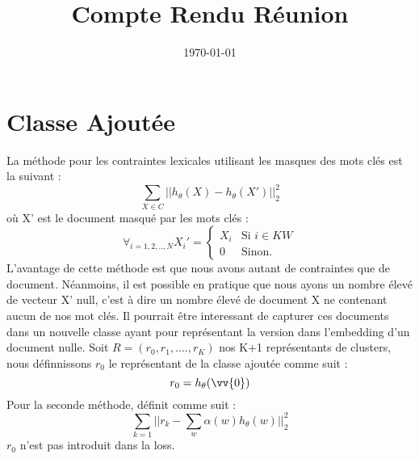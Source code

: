 \documentclass[a4paper]{article}
\title{Compte Rendu Réunion}
\date{\today}
\begin{document}
\maketitle
\section{Classe Ajoutée}
La méthode pour les contraintes lexicales utilisant les masques des mots clés est la suivant :
\begin{equation*}
\sum_{X \in C} ||h_{\theta}(X) - h_{\theta}(X') ||_2^2
\end{equation*} où X' est le document masqué par les mots clés :
\begin{equation*}
\forall_{i=1,2,..,N}X_i' = \left\{
\begin{array}{ll}
  X_i & \mbox{Si } i \in KW \\
  0 & \mbox{Sinon.}
\end{array}
\right.
\end{equation*}
L'avantage de cette méthode est que nous avons autant de contraintes que de document. 
Néanmoins, il est possible en pratique que nous ayons un nombre élevé de vecteur X'
null, c'est à dire un nombre élevé de document X ne contenant aucun de nos mot clés.
Il pourrait être interessant de capturer ces documents dans un nouvelle classe ayant 
pour représentant la version dans l'embedding d'un document nulle. Soit    
$R=(r_0, r_1, ...., r_K)$ nos K+1 représentants de clusters, nous définnissons 
$r_0$ le représentant de la classe ajoutée comme suit : 
$$r_0 = h_\theta(\vv{0})$$
Pour la seconde méthode, définit comme suit :
$$ \sum_{k=1} || r_k - \sum_w \alpha(w)h_\theta(w)||_2^2$$
$r_0$ n'est pas introduit dans la loss.
\end{document}
